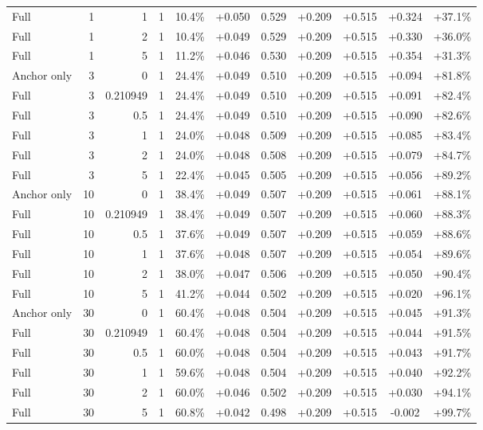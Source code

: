 \begin{table}[htbp]
\begin{tabular}{lrrrccccccc}
Full & 1 & 1 & 1 & 10.4\% & +0.050 & 0.529 & +0.209 & +0.515 & +0.324 & +37.1\% \\
Full & 1 & 2 & 1 & 10.4\% & +0.049 & 0.529 & +0.209 & +0.515 & +0.330 & +36.0\% \\
Full & 1 & 5 & 1 & 11.2\% & +0.046 & 0.530 & +0.209 & +0.515 & +0.354 & +31.3\% \\
Anchor only & 3 & 0 & 1 & 24.4\% & +0.049 & 0.510 & +0.209 & +0.515 & +0.094 & +81.8\% \\
Full & 3 & 0.210949 & 1 & 24.4\% & +0.049 & 0.510 & +0.209 & +0.515 & +0.091 & +82.4\% \\
Full & 3 & 0.5 & 1 & 24.4\% & +0.049 & 0.510 & +0.209 & +0.515 & +0.090 & +82.6\% \\
Full & 3 & 1 & 1 & 24.0\% & +0.048 & 0.509 & +0.209 & +0.515 & +0.085 & +83.4\% \\
Full & 3 & 2 & 1 & 24.0\% & +0.048 & 0.508 & +0.209 & +0.515 & +0.079 & +84.7\% \\
Full & 3 & 5 & 1 & 22.4\% & +0.045 & 0.505 & +0.209 & +0.515 & +0.056 & +89.2\% \\
Anchor only & 10 & 0 & 1 & 38.4\% & +0.049 & 0.507 & +0.209 & +0.515 & +0.061 & +88.1\% \\
Full & 10 & 0.210949 & 1 & 38.4\% & +0.049 & 0.507 & +0.209 & +0.515 & +0.060 & +88.3\% \\
Full & 10 & 0.5 & 1 & 37.6\% & +0.049 & 0.507 & +0.209 & +0.515 & +0.059 & +88.6\% \\
Full & 10 & 1 & 1 & 37.6\% & +0.048 & 0.507 & +0.209 & +0.515 & +0.054 & +89.6\% \\
Full & 10 & 2 & 1 & 38.0\% & +0.047 & 0.506 & +0.209 & +0.515 & +0.050 & +90.4\% \\
Full & 10 & 5 & 1 & 41.2\% & +0.044 & 0.502 & +0.209 & +0.515 & +0.020 & +96.1\% \\
Anchor only & 30 & 0 & 1 & 60.4\% & +0.048 & 0.504 & +0.209 & +0.515 & +0.045 & +91.3\% \\
Full & 30 & 0.210949 & 1 & 60.4\% & +0.048 & 0.504 & +0.209 & +0.515 & +0.044 & +91.5\% \\
Full & 30 & 0.5 & 1 & 60.0\% & +0.048 & 0.504 & +0.209 & +0.515 & +0.043 & +91.7\% \\
Full & 30 & 1 & 1 & 59.6\% & +0.048 & 0.504 & +0.209 & +0.515 & +0.040 & +92.2\% \\
Full & 30 & 2 & 1 & 60.0\% & +0.046 & 0.502 & +0.209 & +0.515 & +0.030 & +94.1\% \\
Full & 30 & 5 & 1 & 60.8\% & +0.042 & 0.498 & +0.209 & +0.515 & -0.002 & +99.7\% \\

\end{tabular}
\end{table}
